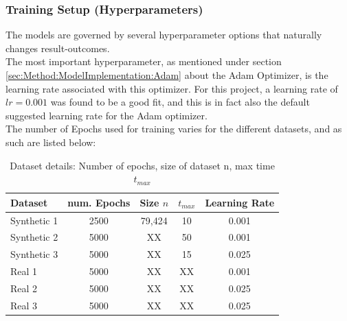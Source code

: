 \subsubsection{Training Setup (Hyperparameters)}
\label{sec:Method:Reproducibility:TrainingSetup}
The models are governed by several hyperparameter options that naturally changes result-outcomes.
\\
The most important hyperparameter, as mentioned under section \ref{sec:Method:ModelImplementation:Adam} about the Adam Optimizer, is the learning rate associated with this optimizer. 
For this project, a learning rate of $lr = 0.001$ was found to be a good fit, and this is in fact also the default suggested learning rate for the Adam optimizer.
\\
The number of Epochs used for training varies for the different datasets, and as such are listed below:

\begin{table}[H]
\centering
\begin{tabular}{|l|cccc|}
\hline
Dataset      & num. Epochs & Size $n$ & $t_{max}$ & Learning Rate \\ \hline
Synthetic 1  & 2500          & 79,424   & 10        & 0.001       \\
Synthetic 2  & 5000          & XX       & 50        & 0.001         \\
Synthetic 3  & 5000          & XX       & 15        & 0.025         \\
Real 1      & 5000          & XX       & XX        & 0.001         \\
Real 2      & 5000          & XX       & XX        & 0.025         \\
Real 3      & 5000          & XX       & XX        & 0.025         \\ \hline
\end{tabular}
\caption{Dataset details: Number of epochs, size of dataset n, max time $t_{max}$}
\label{tab:DatasetDetails}
\end{table}




